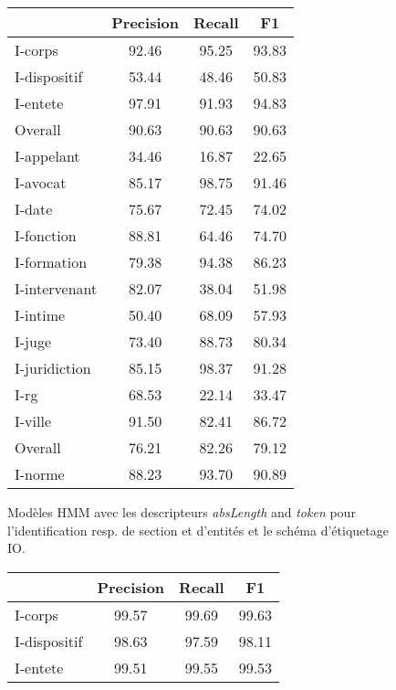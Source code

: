 \begin{table}[!h]
\centering
\scriptsize
\begin{subfigure}[t]{0.45\textwidth}
\centering
\begin{tabular}{|l|ccc|}
\hline
        & Precision  &  Recall   & F1 \\\hline
I-corps &   92.46 &  95.25 &  93.83 \\
I-dispositif &   53.44 &  48.46 &  50.83 \\
I-entete &   97.91 &  91.93 &  94.83 \\\hline
Overall &   90.63 &  90.63 &  90.63 \\\hline
 \noalign{\smallskip}\hline\noalign{\smallskip}
I-appelant &   34.46 &  16.87 &  22.65 \\
I-avocat &   85.17 &  98.75 &  91.46 \\
I-date  &   75.67 &  72.45 &  74.02 \\
I-fonction &   88.81 &  64.46 &  74.70 \\
I-formation &   79.38 &  94.38 &  86.23 \\
I-intervenant &   82.07 &  38.04 &  51.98 \\
I-intime &   50.40 &  68.09 &  57.93 \\
I-juge  &   73.40 &  88.73 &  80.34 \\
I-juridiction &   85.15 &  98.37 &  91.28 \\
I-rg    &   68.53 &  22.14 &  33.47 \\
I-ville &   91.50 &  82.41 &  86.72 \\\hline
Overall &   76.21 &  82.26 &  79.12 \\\hline
 \noalign{\smallskip}\hline\noalign{\smallskip}
I-norme &   88.23 &  93.70 &  90.89 \\\hline
\end{tabular}
\caption{Modèles HMM avec les descripteurs \textit{absLength} and \textit{token} pour l'identification resp. de section et d'entités et le schéma d'étiquetage IO.}\label{tab:structuration:perf-detail-token-hmm}
\end{subfigure} 
\hfill
\begin{subfigure}[t]{0.45\textwidth}
\centering
\begin{tabular}{|l|ccc|}
\hline
         & Precision &  Recall  & F1 \\\hline
I-corps &   99.57 &  99.69 &  99.63 \\
I-dispositif &   98.63 &  97.59 &  98.11 \\
I-entete &   99.51 &  99.55 &  99.53 \\\hline

\end{tabular}
\end{subfigure}
\end{table}
